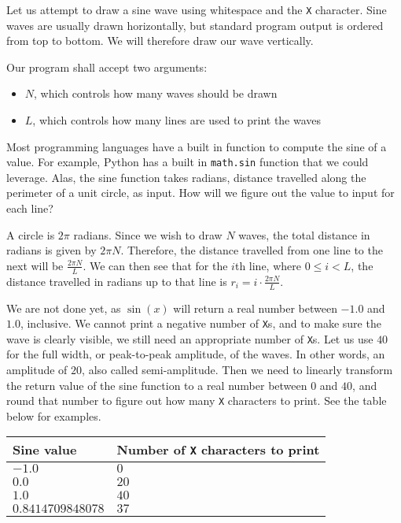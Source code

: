 
Let us attempt to draw a sine wave using whitespace and the \texttt{X} character.
Sine waves are usually drawn horizontally,
but standard program output is ordered from top to bottom.
We will therefore draw our wave vertically.

Our program shall accept two arguments:
\begin{itemize}
    \item $N$, which controls how many waves should be drawn
    \item $L$, which controls how many lines are used to print the waves
\end{itemize}

Most programming languages have a built in function to compute the sine of a value.
For example, Python has a built in \texttt{math.sin} function that we could leverage.
Alas, the sine function takes radians, distance travelled along the perimeter of a unit circle, as input.
How will we figure out the value to input for each line?

A circle is $2 \pi$ radians.
Since we wish to draw $N$ waves, the total distance in radians is given by $2 \pi N$.
Therefore, the distance travelled from one line to the next will be $\frac{2 \pi N}{L}$.
We can then see that for the $i$th line, where $0 \leq i < L$, the distance travelled in radians up to that line is
$r_i = i \cdot \frac{2 \pi N}{L}$.

We are not done yet, as $\sin(x)$ will return a real number between $-1.0$ and $1.0$, inclusive.
We cannot print a negative number of \texttt{X}s,
and to make sure the wave is clearly visible,
we still need an appropriate number of \texttt{X}s.
Let us use $40$ for the full width, or peak-to-peak amplitude, of the waves.
In other words, an amplitude of $20$, also called semi-amplitude.
Then we need to linearly transform the return value of the sine function to a real number between $0$ and $40$,
and round that number to figure out how many \texttt{X} characters to print.
See the table below for examples.

\begin{tabular}{|l|l|}
\hline
Sine value         & Number of \texttt{X} characters to print \\ \hline
$-1.0$	           & $0$ \\ \hline
$0.0$	           & $20$ \\ \hline
$1.0$	           & $40$ \\ \hline
$0.8414709848078$  & $37$ \\ \hline
\end{tabular}

